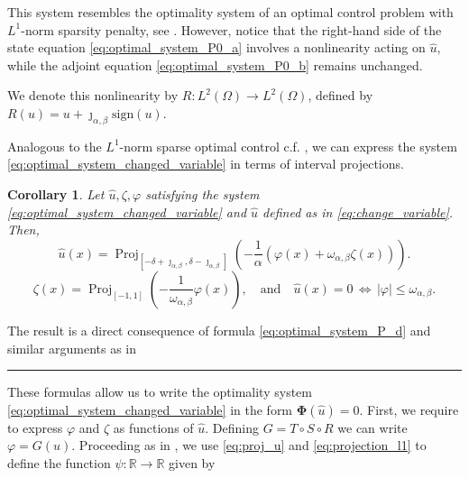 \documentclass[11pt,a4paper]{amsart}
\newcommand{\kw}{\rule{2mm}{2mm}}
\renewcommand{\l}{\left}
\renewcommand{\r}{\right}
\newcommand{\om}{\Omega}
\newcommand{\reals}{\mathbb{R}}
\newcommand{\sign}{\mathrm{sign}}
\DeclareMathOperator{\proj}{Proj}
\renewenvironment{proof}{{Proof.}}{\hfill\kw}
\newtheorem{corollary}{{Corollary}}
\begin{document}
This system resembles the optimality system of an optimal control problem with $L^1$-norm sparsity penalty, see \cite{CasasMateos2024}.  However, notice that the right-hand side of the state equation \eqref{eq:optimal_system_P0_a} involves a nonlinearity acting on $\hat 
u$, while the adjoint equation \eqref{eq:optimal_system_P0_b} remains unchanged. 

We denote this nonlinearity  by $R:L^2(\om) \to L^2(\om)$, defined by $R(u)=u+\jmath_{\alpha,\beta}\sign(u)$.

Analogous to the $L^1$-norm sparse optimal control c.f. \cite{CasasMateos2024}, we can express the system \eqref{eq:optimal_system_changed_variable} in terms of interval projections. 

\begin{corollary}
    Let $\hat u, \zeta, \varphi$ satisfying the system \eqref{eq:optimal_system_changed_variable} and $\hat u$ defined as in \eqref{eq:change_variable}. Then,
    \begin{equation}\label{eq:proj_u}
     \hat u(x)=\proj_{[-\delta+\jmath_{\alpha,\beta}, \delta-\jmath_{\alpha, \beta}]}\l(-\frac{1}{\alpha}\l(\varphi(x)+\omega_{\alpha,\beta}\zeta(x)\r)\r).   
    \end{equation}
    \begin{equation}\label{eq:projection_l1}
        \zeta(x) = \proj_{[-1,1]}\l(-\frac{1}{\omega_{\alpha,\beta}}\varphi(x)\r), \quad \text{and}\quad \hat u(x)=0\, \Longleftrightarrow \, |\varphi|\leq \omega_{\alpha,\beta}.
    \end{equation}
\end{corollary}



\begin{proof}
    The result is a direct consequence of formula \eqref{eq:optimal_system_P_d} and similar arguments as in \cite[Theorem 3.2]{casas2012}
\end{proof}

These formulas allow us to write the optimality system \eqref{eq:optimal_system_changed_variable} in the form $\mathbf{\Phi}(\hat u) =0$. First, we require to express $\varphi$ and $\zeta$ as functions of $\hat u$. Defining $G = T \circ S \circ R$  we can write $\varphi = G(u)$. Proceeding as in \cite{CasasMateos2024}, we use \eqref{eq:proj_u} and \eqref{eq:projection_l1} to define the function $\psi:\reals \to \reals$ given by
\end{document}
